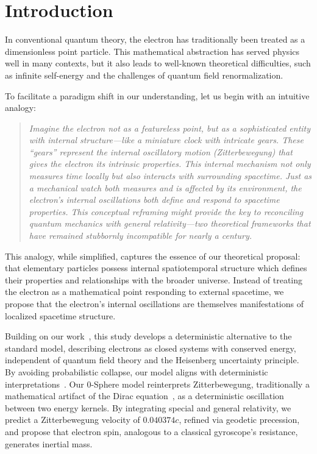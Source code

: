 \documentclass[%
 reprint,
 amsmath,amssymb,
 aps,
]{revtex4-1}
\numberwithin{equation}{section}%
\begin{document}
\maketitle

\section{Introduction}

In conventional quantum theory, the electron has traditionally been treated as a dimensionless point particle. This mathematical abstraction has served physics well in many contexts, but it also leads to well-known theoretical difficulties, such as infinite self-energy and the challenges of quantum field renormalization.

To facilitate a paradigm shift in our understanding, let us begin with an intuitive analogy:

\begin{quote}
\textit{Imagine the electron not as a featureless point, but as a sophisticated entity with internal structure—like a miniature clock with intricate gears. These ``gears'' represent the internal oscillatory motion (Zitterbewegung) that gives the electron its intrinsic properties. This internal mechanism not only measures time locally but also interacts with surrounding spacetime. Just as a mechanical watch both measures and is affected by its environment, the electron's internal oscillations both define and respond to spacetime properties. This conceptual reframing might provide the key to reconciling quantum mechanics with general relativity—two theoretical frameworks that have remained stubbornly incompatible for nearly a century.}
\end{quote}

This analogy, while simplified, captures the essence of our theoretical proposal: that elementary particles possess internal spatiotemporal structure which defines their properties and relationships with the broader universe. Instead of treating the electron as a mathematical point responding to external spacetime, we propose that the electron's internal oscillations are themselves manifestations of localized spacetime structure.

Building on our work~\cite{hanamura2023}, this study develops a deterministic alternative to the standard model, describing electrons as closed systems with conserved energy, independent of quantum field theory and the Heisenberg uncertainty principle. By avoiding probabilistic collapse, our model aligns with deterministic interpretations~\cite{bohm1952}. Our 0-Sphere model reinterprets Zitterbewegung, traditionally a mathematical artifact of the Dirac equation~\cite{schrodinger1930}, as a deterministic oscillation between two energy kernels. By integrating special and general relativity, we predict a Zitterbewegung velocity of $0.040374c$, refined via geodetic precession, and propose that electron spin, analogous to a classical gyroscope's resistance, generates inertial mass.
\end{document}
